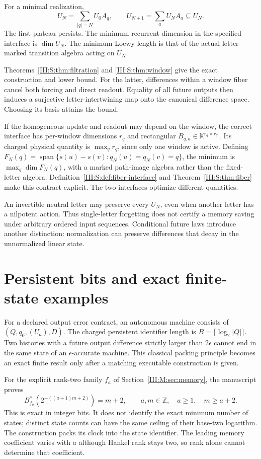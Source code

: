 \begin{theorem}
For a minimal realization,
\[
 U_N=\sum_{|q|=N}U_0A_q,\qquad
 U_{N+1}=\sum_a U_NA_a\subseteq U_N.
\]
The first plateau persists. The minimum recurrent dimension in the
specified interface is $\dim U_N$. The minimum Loewy length is that
of the actual letter-marked transition algebra acting on $U_N$.
\end{theorem}
Theorems~\ref{III:S:thm:filtration} and \ref{III:S:thm:window} give the exact
construction and lower bound. For the latter, differences within a
window fiber cancel both forcing and direct readout. Equality of all
future outputs then induces a surjective letter-intertwining map onto
the canonical difference space. Choosing its basis attains the bound.

If the homogeneous update and readout may depend on the window, the
correct interface has per-window dimensions $r_q$ and rectangular
$B_{q,a}\in\mathbb K^{r_q\times r_{q'}}$. Its charged physical
quantity is $\max_q r_q$, since only one window is active. Defining
$F_N(q)=\operatorname{span}\{s(u)-s(v):q_N(u)=q_N(v)=q\}$, the
minimum is $\max_q\dim F_N(q)$, with a marked path-image algebra
rather than the fixed-letter algebra. Definition~\ref{III:S:def:fiber-interface}
and Theorem~\ref{III:S:thm:fiber} make this contract explicit. The two
interfaces optimize different quantities.

An invertible neutral letter may preserve every $U_N$, even when
another letter has a nilpotent action. Thus single-letter forgetting does
not certify a memory saving under arbitrary ordered input sequences.
Conditional future laws introduce another distinction: normalization can
preserve differences that decay in the unnormalized linear state.

\section{Persistent bits and exact finite-state examples}
For a declared output error contract, an autonomous machine consists of
$(Q,q_0,(U_a),D)$. The charged persistent identifier length is
$B=\lceil\log_2|Q|\rceil$. Two histories with a future output difference
strictly larger than $2\epsilon$ cannot end in the same state of an
$\epsilon$-accurate machine. This classical packing principle becomes an
exact finite result only after a matching executable construction is given.

For the explicit rank-two family $f_a$ of
Section~\ref{III:M:sec:memory}, the manuscript proves
\[
 B_{f_a}^*(2^{-((a+1)m+2)})=m+2,
 \qquad a,m\in\mathbb Z,\quad a\ge1,\quad m\ge a+2.
\]
This is exact in integer bits. It does not identify the exact minimum
number of states; distinct state counts can have the same ceiling of
their base-two logarithm. The construction packs its clock into the state
identifier. The leading memory coefficient varies with $a$ although
Hankel rank stays two, so rank alone cannot determine that coefficient.

